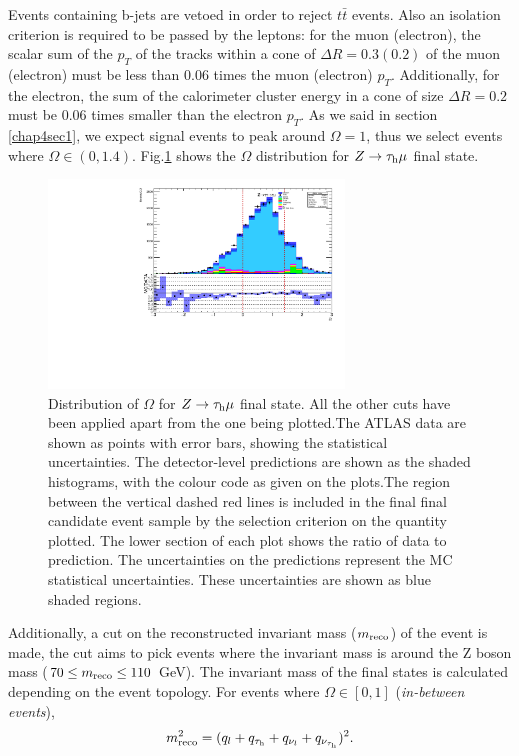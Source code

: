 Events containing b-jets are vetoed in order to reject $t\bar{t}$ events. Also an isolation criterion is required to be passed by the leptons: for the muon (electron), the scalar sum of the $p_T$ of the tracks within a cone of $\Delta R=0.3 (0.2)$ of the muon (electron) must be less than 0.06 times the muon (electron) $p_T$. Additionally, for the electron, the sum of the calorimeter cluster energy in a cone of size $\Delta R=0.2$ must be 0.06 times smaller than the electron $p_T$. As we said in section \ref{chap4sec1}, we expect signal events to peak around $\Omega=1$, thus we select events where $\Omega\in (0,1.4)$. Fig.\ref{Fig9} shows the $\Omega$ distribution for $Z\to\tau_\text{h}\mu$ final state.
\begin{figure}[H]
	\centering
	\includegraphics[width=0.7\textwidth]{figures/Fig9}
	\caption{Distribution of $\Omega$ for $Z\to\tau_\text{h}\mu$ final state. All the other cuts have been applied apart from the one being plotted.The ATLAS data are shown as points with error bars, showing the statistical uncertainties. The detector-level predictions are shown as the shaded histograms, with the colour code as given on the plots.The region between the vertical dashed red lines is included in the final final candidate event sample by the selection criterion on the quantity plotted. The lower section of each plot shows the ratio of data to prediction. The uncertainties on the predictions represent the MC statistical uncertainties. These uncertainties are shown as blue shaded regions.}
	\label{Fig9}
\end{figure}
Additionally, a cut on the reconstructed invariant mass ($m_{\text{reco}}$) of the event is made, the cut aims to pick events where the invariant mass is around the Z boson mass ($70\leq m_{\text{reco}}\leq 110$ GeV). The invariant mass of the final states is calculated depending on the event topology. For events where $\Omega\in [0,1]$ (\textit{in-between events}),
\begin{equation}
	m_{\text{reco}}^{2}=(q_l+q_{\tau_\text{h}}+q_{\nu_l}+q_{\nu_{\tau_\text{h}}})^2.
	\label{eq35}
\end{equation}

